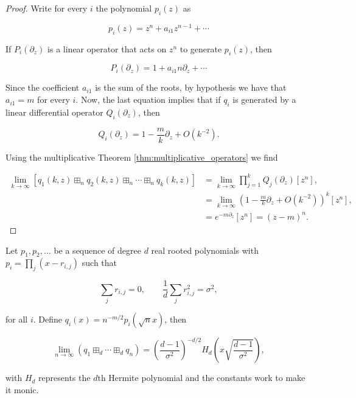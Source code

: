 \begin{proof}
    Write for every $i$ the polynomial $p_i(z)$ as

    \begin{equation*}
        p_i(z) = z^n + a_{i1} z^{n-1} + \cdots 
    \end{equation*}

    If $P_i(\partial_z)$ is a linear operator that acts on $z^n$ to generate $p_i(z)$, then 

    \begin{equation*}
        P_i(\partial_z) = 1 + a_{i1} n \partial_z + \cdots 
    \end{equation*}

    Since the coefficient $a_{i1}$ is the sum of the roots, by hypothesis we have that $a_{i1} = m$ for every $i$. Now, the last equation implies that if $q_i$ is generated by a linear differential operator $Q_i(\partial_z)$, then

    \begin{equation*}
        Q_i(\partial_z) = 1 - \frac{m}{k}\partial_z + O(k^{-2}).
    \end{equation*}

    Using the multiplicative Theorem \ref{thm:multiplicative_operators} we find

    \begin{align*}
        \lim_{k\to \infty} [ q_1(k,z) \boxplus_n q_2(k,z) \boxplus_n \cdots \boxplus_n q_k(k,z) ] &= \lim_{k\to\infty}\prod_{j=1}^k Q_j(\partial_z)[z^n],\\
        &= \lim_{k\to\infty} \left( 1 - \frac{m}{k}\partial_z + O(k^{-2}) \right)^k[z^n],\\
        &= e^{-m\partial_z}[z^n] = (z-m)^n.
    \end{align*}
\end{proof}

\begin{theorem}
    Let $p_1, p_2, \dots$ be a sequence of degree $d$ real rooted polynomials with $p_i = \prod_j (x - r_{i,j})$ such that

    \begin{equation*}
        \sum_{j} r_{i,j} = 0, \qquad \frac1d \sum_j r^2_{i,j} = \sigma^2,
    \end{equation*}

    \noindent for all $i$. Define $q_i(x) = n^{-m/2}p_i(\sqrt{n}x)$, then 

    \begin{equation*}
        \lim_{n\to\infty} \left( q_1 \boxplus_d \cdots \boxplus_d q_n \right) = \left( \frac{d-1}{\sigma^2} \right)^{-d/2} H_d\left( x \sqrt{\frac{d-1}{\sigma^2}} \right),
    \end{equation*}

    \noindent with $H_d$ represents the $d$th Hermite polynomial and the constants work to make it monic.
\end{theorem}


